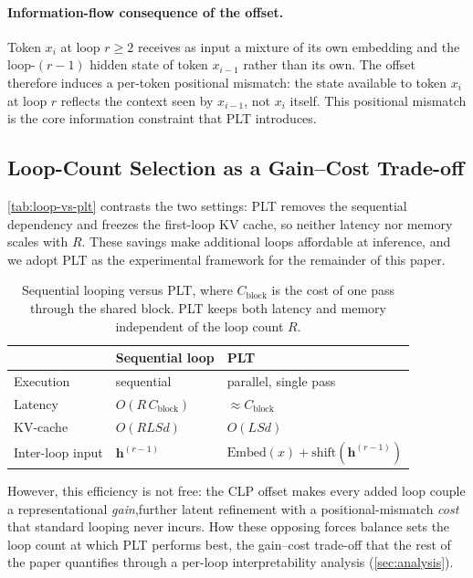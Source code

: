 \documentclass{llmxive}
\providecommand{\hidden}{\mathbf{h}}
\providecommand{\loopcount}{R}
\begin{document}
\paragraph{Information-flow consequence of the offset.}
Token $x_i$ at loop $r \geq 2$ receives as input a mixture of its own
embedding and the loop-$(r-1)$ hidden state of token $x_{i-1}$ rather
than its own.
The offset therefore induces a per-token positional mismatch: the state
available to token $x_i$ at loop $r$ reflects the context seen by
$x_{i-1}$, not $x_i$ itself.
This positional mismatch is the core information constraint that PLT introduces.

\subsection{Loop-Count Selection as a Gain--Cost Trade-off}
\label{sec:gaincost}

\autoref{tab:loop-vs-plt} contrasts the two settings: PLT removes the sequential
dependency and freezes the first-loop KV cache, so neither latency nor memory
scales with $\loopcount$.
These savings make additional loops affordable at inference, and we adopt PLT as
the experimental framework for the remainder of this paper.

\begin{table}[t]
\centering
\begin{tabular}{lll}
\toprule
 & \textbf{Sequential loop} & \textbf{PLT} \\
\midrule
Execution        & sequential                        & parallel, single pass \\
Latency          & $O(\loopcount\,C_{\text{block}})$  & $\approx C_{\text{block}}$ \\
KV-cache         & $O(\loopcount L S d)$              & $O(L S d)$ \\
Inter-loop input & $\hidden^{(r-1)}$                  & $\mathrm{Embed}(x) + \mathrm{shift}(\hidden^{(r-1)})$ \\
\bottomrule
\end{tabular}
\caption{Sequential looping versus PLT, where $C_{\text{block}}$ is the cost of
one pass through the shared block. PLT keeps both latency and memory independent
of the loop count $\loopcount$.}
\label{tab:loop-vs-plt}
\end{table}

However, this efficiency is not free: the CLP offset 
makes every added loop couple a representational \emph{gain},further latent
refinement with a positional-mismatch \emph{cost} that standard looping never
incurs.
How these opposing forces balance sets the loop count at which PLT performs
best, the gain--cost trade-off that the rest of the paper quantifies through a
per-loop interpretability analysis (\autoref{sec:analysis}).
\end{document}
